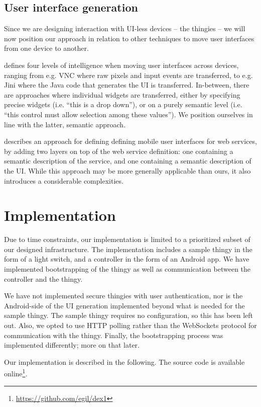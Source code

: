 \documentclass{ubicomp2012}
\begin{document}
\subsection{User interface generation}

Since we are designing interaction with UI-less devices -- the thingies -- we will now position our approach in relation to other techniques to move user interfaces from one device to another.

\cite{kindbergSystem} defines four levels of intelligence when moving user interfaces across devices, ranging from e.g. VNC \cite{vnc} where raw pixels and input events are transferred, to e.g. Jini \cite{jini} where the Java code that generates the UI is transferred. In-between, there are approaches where individual widgets are transferred, either by specifying precise widgets (i.e. ``this is a drop down''), or on a purely semantic level (i.e. ``this control must allow selection among these values''). We position ourselves in line with the latter, semantic approach.

\cite{mobileServiceUsage} describes an approach for defining defining mobile user interfaces for web services, by adding two layers on top of the web service definition: one containing a semantic description of the service, and one containing a semantic description of the UI. While this approach may be more generally applicable than ours, it also introduces a considerable complexities.
\section{Implementation}

Due to time constraints, our implementation is limited to a prioritized subset of our designed infrastructure. The implementation includes a sample thingy in the form of a light switch, and a controller in the form of an Android app. We have implemented bootstrapping of the thingy as well as communication between the controller and the thingy.

We have not implemented secure thingies with user authentication, nor is the Android-side of the UI generation implemented beyond what is needed for the sample thingy. The sample thingy requires no configuration, so this has been left out. Also, we opted to use HTTP polling rather than the WebSockets protocol for communication with the thingy. Finally, the bootstrapping process was implemented differently; more on that later.

Our implementation is described in the following. The source code is available online\footnote{\url{https://github.com/egil/dex1}}.
\end{document}
